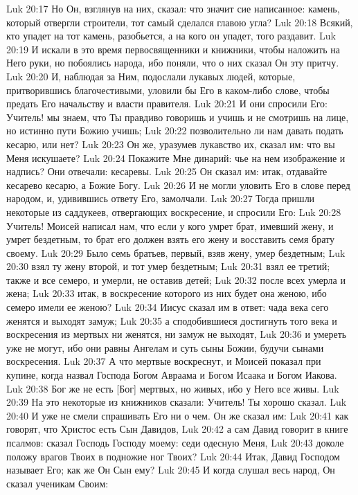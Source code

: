 Luk 20:17  Но Он, взглянув на них, сказал: что значит сие написанное: камень, который отвергли строители, тот самый сделался главою угла?
Luk 20:18  Всякий, кто упадет на тот камень, разобьется, а на кого он упадет, того раздавит.
Luk 20:19  И искали в это время первосвященники и книжники, чтобы наложить на Него руки, но побоялись народа, ибо поняли, что о них сказал Он эту притчу.
Luk 20:20  И, наблюдая за Ним, подослали лукавых людей, которые, притворившись благочестивыми, уловили бы Его в каком-либо слове, чтобы предать Его начальству и власти правителя.
Luk 20:21  И они спросили Его: Учитель! мы знаем, что Ты правдиво говоришь и учишь и не смотришь на лице, но истинно пути Божию учишь;
Luk 20:22  позволительно ли нам давать подать кесарю, или нет?
Luk 20:23  Он же, уразумев лукавство их, сказал им: что вы Меня искушаете?
Luk 20:24  Покажите Мне динарий: чье на нем изображение и надпись? Они отвечали: кесаревы.
Luk 20:25  Он сказал им: итак, отдавайте кесарево кесарю, а Божие Богу.
Luk 20:26  И не могли уловить Его в слове перед народом, и, удивившись ответу Его, замолчали.
Luk 20:27  Тогда пришли некоторые из саддукеев, отвергающих воскресение, и спросили Его:
Luk 20:28  Учитель! Моисей написал нам, что если у кого умрет брат, имевший жену, и умрет бездетным, то брат его должен взять его жену и восставить семя брату своему.
Luk 20:29  Было семь братьев, первый, взяв жену, умер бездетным;
Luk 20:30  взял ту жену второй, и тот умер бездетным;
Luk 20:31  взял ее третий; также и все семеро, и умерли, не оставив детей;
Luk 20:32  после всех умерла и жена;
Luk 20:33  итак, в воскресение которого из них будет она женою, ибо семеро имели ее женою?
Luk 20:34  Иисус сказал им в ответ: чада века сего женятся и выходят замуж;
Luk 20:35  а сподобившиеся достигнуть того века и воскресения из мертвых ни женятся, ни замуж не выходят,
Luk 20:36  и умереть уже не могут, ибо они равны Ангелам и суть сыны Божии, будучи сынами воскресения.
Luk 20:37  А что мертвые воскреснут, и Моисей показал при купине, когда назвал Господа Богом Авраама и Богом Исаака и Богом Иакова.
Luk 20:38  Бог же не есть [Бог] мертвых, но живых, ибо у Него все живы.
Luk 20:39  На это некоторые из книжников сказали: Учитель! Ты хорошо сказал.
Luk 20:40  И уже не смели спрашивать Его ни о чем. Он же сказал им:
Luk 20:41  как говорят, что Христос есть Сын Давидов,
Luk 20:42  а сам Давид говорит в книге псалмов: сказал Господь Господу моему: седи одесную Меня,
Luk 20:43  доколе положу врагов Твоих в подножие ног Твоих?
Luk 20:44  Итак, Давид Господом называет Его; как же Он Сын ему?
Luk 20:45  И когда слушал весь народ, Он сказал ученикам Своим:
